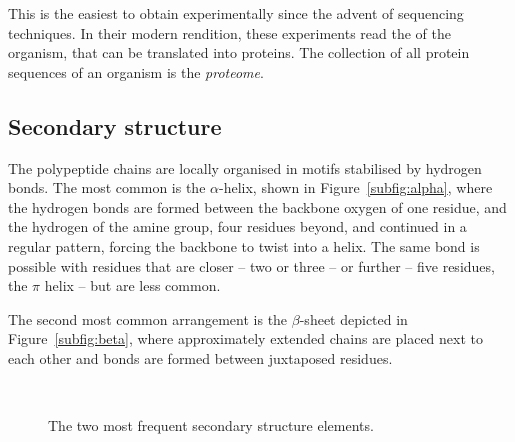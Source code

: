 This is the easiest to obtain experimentally since the advent of sequencing techniques.
In their modern rendition, these experiments read the \DNA{} of the organism, that can be translated into proteins.
The collection of all protein sequences of an organism is the \emph{proteome}.


\subsection{Secondary structure}
The polypeptide chains are locally organised in motifs stabilised by hydrogen bonds.
The most common is the $\alpha$-helix, \sidenote{$\alpha$} shown in Figure~\ref{subfig:alpha}, where the hydrogen bonds are formed between the backbone oxygen of one residue, and the hydrogen of the amine group, four residues beyond, and continued in a regular pattern, forcing the backbone to twist into a helix.
The same bond is possible with residues that are closer -- two or three -- or further  -- five residues, the $\pi$ helix -- but are less common.

The second most common arrangement is the $\beta$-sheet  \sidenote{$\beta$} depicted in Figure~\ref{subfig:beta}, where approximately extended chains are placed next to each other and bonds are formed between juxtaposed residues.


\begin{figure}[htbp]
	\centering
	\\
	\caption{The two most frequent secondary structure elements.}\label{fig:alpha_beta}
\end{figure}


